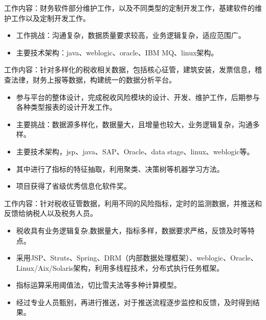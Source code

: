 \documentclass{resume}
\begin{document}
\begin{onehalfspacing}
工作内容：财务软件部分维护工作，以及不同类型的定制开发工作，基建软件的维护工作以及定制开发工作。
\begin{itemize}
  \item 工作挑战：沟通复杂，数据质量要求较高，业务逻辑复杂，适应范围广。
  \item 主要技术架构：java、weblogic、oracle、IBM MQ、linux架构。
\end{itemize}
\end{onehalfspacing}

\begin{onehalfspacing}
工作内容：针对多样化的税收相关数据，包括核心征管，建筑安装，发票信息，稽查法律，财务上报等数据，构建统一的数据分析平台。
\begin{itemize}
  \item 参与平台的整体设计，完成税收风险模块的设计、开发、维护工作，后期参与各种类型报表的设计开发工作。
  \item 主要挑战：数据源多样化，数据量大，且增量也较大，业务逻辑复杂，沟通多样。
  \item 主要技术架构，jsp、java、SAP、Oracle、data stage、linux、weblogic等。
  \item 其中进行了指标的特征抽取，利用聚类、决策树等机器学习方法。
  \item 项目获得了省级优秀信息化软件奖。
\end{itemize}
\end{onehalfspacing}


\begin{onehalfspacing}
工作内容：针对税收征管数据，利用不同的风险指标，定时的监测数据，并推送和反馈给纳税人以及税务人员。
\begin{itemize}
  \item 税收具有业务逻辑复杂,数据量大，指标多样，数据要求严格，反馈及时等特点。
  \item 采用JSP、Struts、Spring、DRM（内部数据处理框架）、weblogic、Oracle、Linux/Aix/Solaris架构，利用多线程技术，分布式执行任务框架。
  \item 指标运算采用阈值法，切比雪夫法等多种计算模型。
  \item 经过专业人员甄别，再进行推送，对于推送流程逐步监控和反馈，及时得到结果。
\end{itemize}
\end{onehalfspacing}
\end{document}
